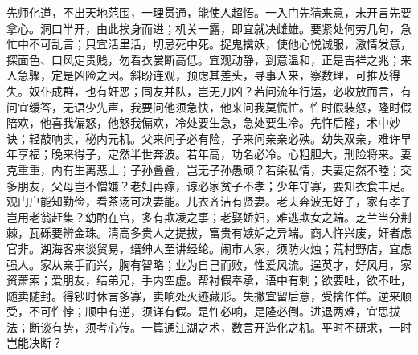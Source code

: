 \documentclass[12pt,UTF8]{ctexbook}
\begin{document}
先师化道，不出天地范围，一理贯通，能使人超悟。一入门先猜来意，未开言先要拿心。洞口半开，由此挨身而进；机关一露，即宜就决雌雄。要紧处何劳几句，急忙中不可乱言；只宜活里活，切忌死中死。捉鬼擒妖，使他心悦诚服，激情发意，探面色、口风定贵贱，勿看衣裳断高低。宜观动静，到意温和，正是吉祥之兆；来人急骤，定是凶险之因。斜盼连观，预虑其差头，寻事人来，察数理，可推及得失。奴仆成群，也有奸恶；同友并队，岂无刀凶？若问流年行运，必收放而言，有问宜缓答，无语少先声，我要问他须急快，他来问我莫慌忙。忤时假装怒，隆时假陪欢，他喜我偏怒，他怒我偏欢，冷处要生急，急处要生冷。先忤后隆，术中妙诀；轻敲响卖，秘内元机。父来问子必有险，子来问亲亲必殃。幼失双亲，难许早年享福；晚来得子，定然半世奔波。若年高，功名必冷。心粗胆大，刑险将来。妻克重重，内有生离恶土；子孙叠叠，岂无子孙愚顽？若染私情，夫妻定然不睦；交多朋友，父母岂不憎嫌？老妇再嫁，谅必家贫子不孝；少年守寡，要知衣食丰足。观门户能知勤俭，看茶汤可决妻能。儿衣齐洁有贤妻。老夫奔波无好子，家有孝子岂用老翁赶集？幼酌在宫，多有欺凌之事；老娶娇妇，难逃欺女之端。芝兰当分荆棘，瓦砾要辨金珠。清高多贵人之提拔，富贵有嫉妒之异端。商人忤兴废，奸者虑官非。湖海客来谈贸易，缙绅人至讲经纶。闹市人家，须防火烛；荒村野店，宜虑强人。家从亲手而兴，胸有智略；业为自己而败，性爱风流。逞英才，好风月，家资萧索；爱朋友，结弟兄，手内空虚。帮衬假奉承，语中有刺；欲要吐，欲不吐，随卖随封。得钞时休言多寡，卖响处灭迹藏形。失撇宜留后意，受擒作佯。逆来顺受，不可忤悖；顺中有逆，须详有假。是忤必响，是隆必倒。进退两难，宜思拔法；断谈有势，须考心传。一篇通江湖之术，数言开造化之机。平时不研求，一时岂能决断？
\end{document}
